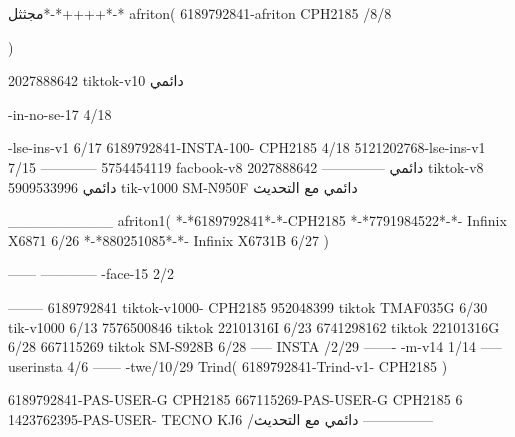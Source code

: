 مجثثل*-*++++*-*
afriton(
6189792841-afriton CPH2185  /8/8

)

2027888642 tiktok-v10
دائمي

-in-no-se-17 4/18

-lse-ins-v1 6/17
6189792841-INSTA-100- CPH2185 4/18
5121202768-lse-ins-v1 7/15
------------
5754454119 facbook-v8
دائمي
--------------
2027888642 tiktok-v8
دائمي
5909533996 tik-v1000  SM-N950F
دائمي مع التحديث

__________
afriton1(
*-*6189792841*-*-CPH2185
*-*7791984522*-*- Infinix X6871  6/26
*-*880251085*-*-  Infinix X6731B  6/27
)


------
------------
-face-15 2/2

--------
6189792841 tiktok-v1000- CPH2185 
952048399 tiktok TMAF035G  6/30
 tik-v1000   6/13
7576500846 tiktok 22101316I  6/23
6741298162 tiktok 22101316G  6/28
667115269 tiktok SM-S928B  6/28
-----
 INSTA /2/29
-------
-m-v14 1/14
-----
userinsta 4/6
------
-twe/10/29
Trind(
6189792841-Trind-v1- CPH2185 
)


6189792841-PAS-USER-G CPH2185 
667115269-PAS-USER-G CPH2185 6
1423762395-PAS-USER- TECNO KJ6  /دائمي مع التحديث
    ---------------
